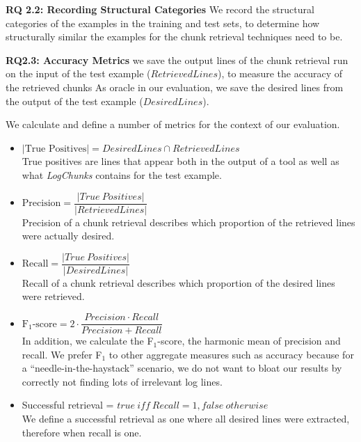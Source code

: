 \noindent
\textbf{RQ 2.2: Recording Structural Categories}
We record the structural categories
of the examples in the training and test sets, to determine how
structurally similar the examples for the chunk
retrieval techniques need to be.

\noindent
\textbf{RQ2.3: Accuracy Metrics}
we save the output lines of the chunk retrieval run on the input
of the test example ($\mathit{RetrievedLines}$), to measure the
accuracy of the retrieved chunks
As oracle in our evaluation, we save the
desired lines from the output of the test example
($\mathit{DesiredLines}$).

We calculate and define a number of metrics for the context of our
evaluation.

\vspace{0.2cm}
\begin{itemize}[leftmargin=0.4cm] \itemsep1em
	\item $|\mbox{True\ Positives}| = \mathit{DesiredLines} \cap
	\mathit{RetrievedLines}$ \vspace{0.2cm}\\
	True positives are lines that appear both in the output of a
	tool as well as what \textit{LogChunks} contains for the
  test example.

	\item $\mbox{Precision} = \dfrac{|\mathit{True\
	Positives}|}{|\mathit{RetrievedLines}|}$ \vspace{0.21cm} \\
	Precision of a chunk retrieval describes which proportion of
	the retrieved lines were actually desired.

	\item $\mbox{Recall} =
	\dfrac{|\mathit{True\ Positives}|}{|\mathit{DesiredLines}|}$
	\vspace{0.2cm} \\
	Recall of a chunk retrieval describes which proportion of the
	desired lines were retrieved.
	\item $\mbox{F$_{1}$-score} = 2 \cdot \dfrac{\mathit{Precision}
	\cdot \mathit{Recall}}{\mathit{Precision} + \mathit{Recall}}$
	\vspace{0.2cm}\\
	In addition, we calculate the F$_{1}$-score, the harmonic mean
	of precision and recall.
We prefer F$_{1}$ to other aggregate
	measures such as accuracy because for a
	``needle-in-the-haystack'' scenario, we do not want to bloat
	our results by correctly not finding lots of irrelevant log
	lines.
	\item Successful retrieval = $\mathit{true}\ \mathit{iff}\
	\mathit{Recall} = 1, \mathit{false\ otherwise}$  \vspace{0.2cm} \\
	We define a successful retrieval as one where all desired
	lines were
	extracted, therefore when recall is one.
\end{itemize}


